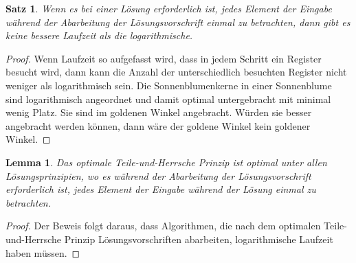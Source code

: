 \documentclass{report}
\newtheorem{satz}{Satz}[section]
\newtheorem{lemma}{Lemma}[section]
\numberwithin{equation}{section}
\begin{document}
\begin{satz}
	Wenn es bei einer Lösung erforderlich ist, jedes Element der Eingabe während der Abarbeitung der Lösungsvorschrift einmal zu betrachten, dann gibt es keine bessere Laufzeit als die logarithmische.
\end{satz}
\begin{proof}
	Wenn Laufzeit so aufgefasst wird, dass in jedem Schritt ein Register besucht wird, dann kann die Anzahl der unterschiedlich besuchten Register nicht weniger als logarithmisch sein. Die Sonnenblumenkerne in einer Sonnenblume sind logarithmisch angeordnet und damit optimal untergebracht mit minimal wenig Platz. Sie sind im goldenen Winkel angebracht. Würden sie besser angebracht werden können, dann wäre der goldene Winkel kein goldener Winkel.
\end{proof}

\begin{lemma}
	Das optimale Teile-und-Herrsche Prinzip ist optimal unter allen Lösungsprinzipien, wo es während der Abarbeitung der Lösungsvorschrift erforderlich ist, jedes Element der Eingabe während der Lösung einmal zu betrachten.
\end{lemma}
\begin{proof}
	Der Beweis folgt daraus, dass Algorithmen, die nach dem optimalen Teile-und-Herrsche Prinzip Lösungsvorschriften abarbeiten, logarithmische Laufzeit haben müssen. 
\end{proof}
\end{document}
